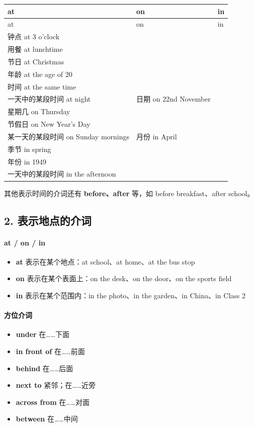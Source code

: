 \documentclass[11pt,a4paper]{ctexart}
\begin{document}
{\footnotesize
\begin{longtable}{p{4.47cm}p{4.47cm}p{4.47cm}}
\hline
at & on & in \\
\hline
\endfirsthead
\hline
at & on & in \\
\hline
\endhead
\hline
\endfoot
钟点 at 3 o’clock\\ 用餐 at lunchtime\\ 节日 at Christmas\\ 年龄 at the age of 20\\ 时间 at the same time\\ 一天中的某段时间 at night & 日期 on 22nd November\\ 星期几 on Thursday\\ 节假日 on New Year’s Day\\ 某一天的某段时间 on Sunday mornings & 月份 in April\\ 季节 in spring\\ 年份 in 1949\\ 一天中的某段时间 in the afternoon \\
\end{longtable}
}

其他表示时间的介词还有 \textbf{before、after} 等，如 before breakfast、after school。

\subsection*{2. 表示地点的介词}

\paragraph{at / on / in}

\begin{itemize}[leftmargin=1.4em]
\item \textbf{at} 表示在某个地点：at school、at home、at the bus stop
\item \textbf{on} 表示在某个表面上：on the desk、on the door、on the sports field
\item \textbf{in} 表示在某个范围内：in the photo、in the garden、in China、in Class 2
\end{itemize}

\paragraph{方位介词}

\begin{itemize}[leftmargin=1.4em]
\item \textbf{under} 在……下面
\item \textbf{in front of} 在……前面
\item \textbf{behind} 在……后面
\item \textbf{next to} 紧邻；在……近旁
\item \textbf{across from} 在……对面
\item \textbf{between} 在……中间
\end{itemize}
\end{document}
